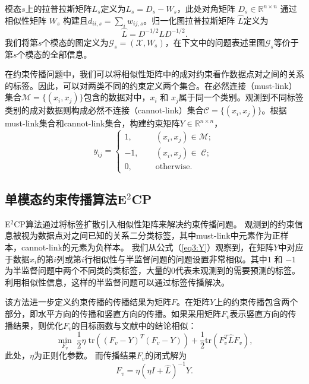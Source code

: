 模态$s$上的拉普拉斯矩阵$ {L}_s $定义为$ {L}_s={D}_s-{W}_s $，此处对角矩阵
$ {D}_s \in \mathbb{R}^{n\times n}$ 通过相似性矩阵 $ {W}_s$ 构建且$ d_{ii,s} =\sum_i w_{ij,s}$\cite{chung1997spectral}。归一化图拉普拉斯矩阵 $ \hat{{L}} $定义为
\begin{equation}
	\hat{{L}} = {D}^{-1/2}{LD}^{-1/2}.
\end{equation}
我们将第$s$个模态的图定义为$\mathcal{G}_s = (\mathcal{X},{W}_s)$，在下文中的问题表述里图$\mathcal{G}_s$等价于第$s$个模态的全部信息。

在约束传播问题中，我们可以将相似性矩阵中的成对约束看作数据点对之间的关系的标签。因此，可以对两类不同的约束定义两个集合。在必然连接（must-link）集合$ \mathcal{M} = \{(x_i,x_j)\} $包含的数据对中，$ x_i $ 和 $ x_j $属于同一个类别。观测到不同标签类别的成对数据则构成必然不连接（cannot-link）集合$ \mathcal{C} = \{(x_i,x_j)\}$。根据must-link集合和cannot-link集合，构建约束矩阵$ {Y} \in  \mathbb{R}^{n\times n}$，
\begin{equation}
y_{ij} = 
\begin{cases}
1, \qquad&(x_i,x_j)\in \mathcal{M};\\
-1, &(x_i,x_j)\in\; \mathcal{C};\\
0, &\text{otherwise}.
\end{cases}
\label{eq3:Y}
\end{equation}

\subsection{单模态约束传播算法E$^2$CP}
E$^2$CP算法通过将标签扩散引入相似性矩阵来解决约束传播问题。
观测到的约束信息被视为数据点对之间已知的关系二分类标签，其中must-link中元素作为正样本，cannot-link的元素为负样本。
我们从公式（\ref{eq3:Y}）观察到，在矩阵$Y$中对应于数据$x_i$的第$i$列或第$i$行相似性与半监督问题的问题设置非常相似。其中$ 1 $ 和 $ -1 $为半监督问题中两个不同类的类标签，大量的$0$代表未观测到的需要预测的标签。利用相似性信息，这样的半监督问题可以通过标签传播\cite{zhou2004learning}解决。

该方法进一步定义约束传播的传播结果为矩阵$F$。在矩阵$Y$上的约束传播包含两个部分，即水平方向的传播和竖直方向的传播。如果采用矩阵$F_v$表示竖直方向的传播结果，则优化$F_v$的目标函数与文献\parencite{zhou2004learning}中的结论相似：
\begin{equation}
	\mathop{\mathrm{min}}_{{F}_v}\;\frac{1}{2}\eta\;\mathrm{tr}(({F}_v-{Y})^T({F}_v-{Y}))+\frac{1}{2}\mathrm{tr}({F}_v^T\hat{{L}}{F}_v), 
\end{equation}
此处，$ \eta $为正则化参数。
而传播结果$F_v$的闭式解为
\begin{equation}
	{F}_v = \eta(\eta{I}+\hat{{L}})^{-1}{Y}.
\end{equation}

